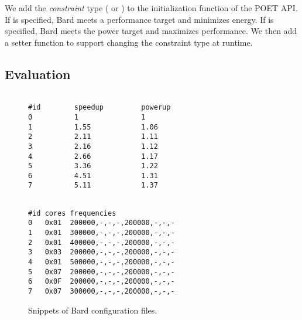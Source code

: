 We add the \emph{constraint} type ( or ) to the initialization function of the POET API.
If  is specified, Bard meets a performance target and minimizes energy.
If  is specified, Bard meets the power target and maximizes performance.
We then add a setter function to support changing the constraint type at runtime.


\subsection{Evaluation}


\begin{figure}[t]
\centering
\begin{minipage}[t]{.45\columnwidth}
\lstset{
  belowskip=0pt,
  aboveskip=0pt,
  numbers=none,
}
\begin{lstlisting}[frame=tlr,%
  caption={System-agnostic.},%
  label={lst:control_config_example}]%

#id        speedup         powerup
0          1               1
1          1.55            1.06
2          2.11            1.11
3          2.16            1.12
4          2.66            1.17
5          3.36            1.22
6          4.51            1.31
7          5.11            1.37
\end{lstlisting}
\end{minipage}\hfill
\begin{minipage}[t]{.45\columnwidth}
\lstset{
  belowskip=0pt,
  aboveskip=0pt,
  numbers=none,
}
\begin{lstlisting}[frame=tlr,%
  caption={System-specific.},%
  label={lst:cpu_config_example}]%

#id cores frequencies
0   0x01  200000,-,-,-,200000,-,-,-
1   0x01  300000,-,-,-,200000,-,-,-
2   0x01  400000,-,-,-,200000,-,-,-
3   0x03  200000,-,-,-,200000,-,-,-
4   0x01  500000,-,-,-,200000,-,-,-
5   0x07  200000,-,-,-,200000,-,-,-
6   0x0F  200000,-,-,-,200000,-,-,-
7   0x07  300000,-,-,-,200000,-,-,-
\end{lstlisting}
\end{minipage}
\caption{Snippets of Bard configuration files.}
\label{fig:bard-config-examples}
\end{figure}

